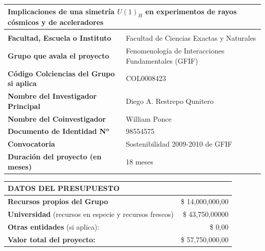 \documentclass[11pt]{article}
\begin{document}
\renewcommand{\arraystretch}{1.71}
\noindent
\hspace{-0.5cm}\begin{tabularx}{1.059\linewidth}{|l|l|}\hline
\multicolumn{2}{|Y|}{\cellcolor[gray]{.8}\textbf{Implicaciones de una simetría $U(1)_H$ en experimentos de rayos cósmicos y de aceleradores}}\\\hline
\multicolumn{2}{|Y|}{}\\\hline
\cellcolor[gray]{.8}\textbf{Facultad, Escuela o Instituto}&Facultad de Ciencias Exactas y Naturales\\\hline
\cellcolor[gray]{.8}\textbf{Grupo que avala el proyecto}& Fenomenología de Interacciones Fundamentales (GFIF)\\\hline
\cellcolor[gray]{.8}\textbf{Código Colciencias del Grupo si aplica}&COL0008423\\\hline
\cellcolor[gray]{.8}\textbf{Nombre del Investigador Principal}&Diego A. Restrepo Qunitero\\\hline
\cellcolor[gray]{.8}\textbf{Nombre del Coinvestigador}&William Ponce\\\hline
\cellcolor[gray]{.8}\textbf{Documento de Identidad N${}^{\text{\textbf{o}}}$}&98554575\\\hline
\cellcolor[gray]{.8}\textbf{Convocatoria}&Sostenibilidad 2009-2010 de GFIF\\\hline
\cellcolor[gray]{.8}\textbf{Duración del proyecto (en meses)}&18 meses\\\hline
\end{tabularx}

\vspace{-0.02cm}
\renewcommand{\arraystretch}{1.038}
\noindent
\hspace{-0.5cm}\begin{tabularx}{1.059\linewidth}{|l|r|}
\multicolumn{2}{|Y|}{\cellcolor[gray]{.8}\textbf{DATOS DEL PRESUPUESTO}}\\[7pt]\hline
\textbf{Recursos propios del Grupo}\hspace{6.2cm}\quad&{\$ 14,000,000,\footnotesize{00}}\\\hline
\textbf{Universidad} \footnotesize{(recursos en especie y recursos  frescos)}&{\$ 43,750,000\footnotesize{00}}\\\hline
\textbf{Otras entidades} \footnotesize{(si aplica):}&{\$ 0,\footnotesize{00}}\\\hline
\textbf{Valor total del proyecto:}&{\$ 57,750,000,\footnotesize{00}}\\\hline
\end{tabularx}
\renewcommand{\arraystretch}{1}
\end{document}

